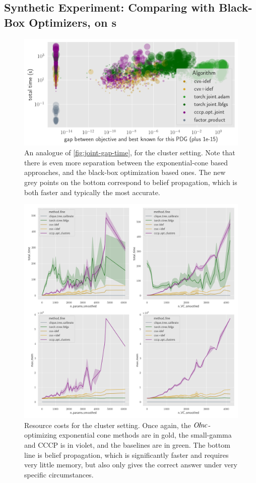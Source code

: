 \begin{subappendices}
\subsection{Synthetic Experiment: Comparing with Black-Box Optimizers, on \AcTree s} \label{sec:clus-expt-details}

\begin{figure}
    \centering
    \includegraphics[width=0.67\linewidth]{figs/rand-clus/gap-vs-time}
    \caption[Objective gap vs time in the cluster setting; shows more separation]
        {An analogue of \cref{fig:joint-gap-time}, for the cluster setting.
    Note that there is even more separation between the exponential-cone based approaches, and the black-box optimization based ones.
    The new grey points on the bottom correspond to belief propagation, which is both faster and typically the most accurate.}
    \label{fig:clus-gap-vs-time--appendix}
\end{figure}
\begin{figure}
    \centering
    \includegraphics[width=0.67\linewidth]{figs/rand-clus/resource-costs}
    \caption[Resource costs for the cluster setting.]
        {Resource costs for the cluster setting. Once again, the $\mathit{O\mskip-2.5muI\mskip-3.5mun\mskip-1.7muc}$-optimizing exponential cone methods are in gold, the small-gamma and CCCP is in violet, and the baselines are in green. The bottom line is belief propagation, which is significantly faster and requires very little memory, but also only gives the correct answer under very specific circumstances.}
    \label{fig:clus-resource-costs}
\end{figure}



\end{subappendices}
